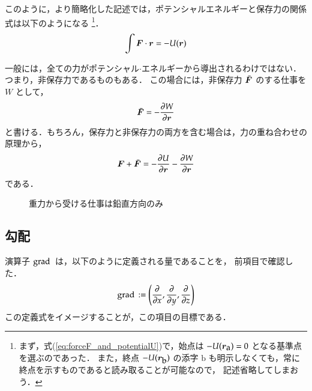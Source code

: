                                    このように，より簡略化した記述では，ポテンシャルエネルギーと保存力の関係式は以下のようになる
                                        \footnote{
                                                まず，式(\ref{eq:forceF_and_potentialU})で，始点は $-U(\boldsymbol{r}_{\mbox{a}})=0$ となる基準点を選ぶのであった．
                                                また，終点 $-U(\boldsymbol{r}_{\mbox{b}})$ の添字 $\mbox{b}$ も明示しなくても，常に終点を示すものであると読み取ることが可能なので，
                                                記述省略してしまおう．
                                        }．
                        \begin{align*}
                                   \int \boldsymbol{F} \cdot \boldsymbol{r}  =  - U(\boldsymbol{r})
                        \end{align*}

                    一般には，全ての力がポテンシャル$\cdot$エネルギーから導出されるわけではない．つまり，非保存力であるものもある．
                    この場合には，非保存力 $\bar{\boldsymbol{F}}$ のする仕事を $W$ として，
                        \begin{align}
                            \bar{\boldsymbol{F}}
                            = -\frac{\partial W}{\partial\boldsymbol{r}}
                        \end{align}
                    と書ける．もちろん，保存力と非保存力の両方を含む場合は，力の重ね合わせの原理から，
                        \begin{align}
                            \boldsymbol{F}+\bar{\boldsymbol{F}}
                            = -\frac{\partial U}{\partial\boldsymbol{r}}
                              -\frac{\partial W}{\partial\boldsymbol{r}}
                        \end{align}
                    である．
                    \begin{figure}[hbt]
                        \begin{center}
                            \caption{重力から受ける仕事は鉛直方向のみ}
                            \label{fig:hozonryoku}
                        \end{center}
                    \end{figure}

        \subsection{勾配}
                    演算子 $\mathrm{grad}\,$ は，以下のように定義される量であることを，
                    前項目で確認した．
                        \begin{align}
                        \mathrm{grad}\,:= \left( \frac{\partial}{\partial x} , \frac{\partial}{\partial y},
                        \frac{\partial}{\partial z}\right)
                        \end{align}
                    この定義式をイメージすることが，この項目の目標である．

